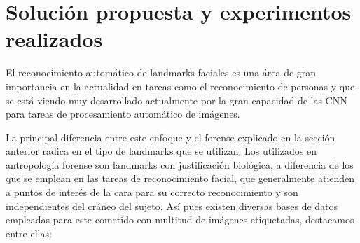 \chapter{Solución propuesta y experimentos realizados}

    \noindent El reconocimiento automático de landmarks faciales es una área de gran importancia en la actualidad en tareas como el reconocimiento de personas y que se está viendo muy desarrollado actualmente por la gran capacidad de las CNN para tareas de procesamiento automático de imágenes. 

    \medskip 

    \noindent La principal diferencia entre este enfoque y el forense explicado en la sección anterior radica en el tipo de landmarks que se utilizan. Los utilizados en antropología forense son landmarks con justificación biológica, a diferencia de los que se emplean en las tareas de reconocimiento facial, que generalmente atienden a puntos de interés de la cara para su correcto reconocimiento y son independientes del cráneo del sujeto. Así pues existen diversas bases de datos empleadas para este cometido con multitud de imágenes etiquetadas, destacamos entre ellas: 

